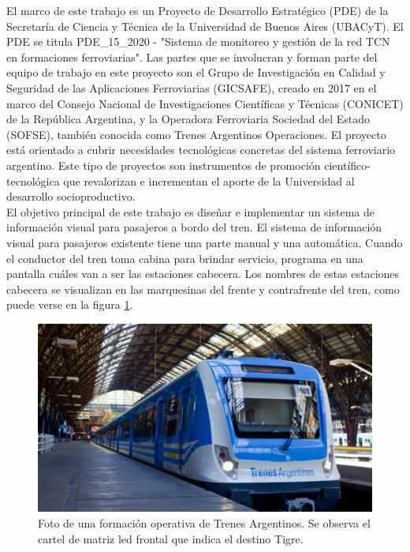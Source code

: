 El  marco de este trabajo es un Proyecto de Desarrollo Estratégico (PDE) de la Secretaría de Ciencia y Técnica de la Universidad de Buenos Aires (UBACyT). El PDE se titula PDE\_15\_2020 - "Sistema de monitoreo y gestión de la red TCN en formaciones ferroviarias". Las partes que se involucran y forman parte del equipo de trabajo en este proyecto son el Grupo de Investigación en Calidad y Seguridad de las Aplicaciones Ferroviarias (GICSAFE), creado en 2017 en el marco del Consejo Nacional de Investigaciones Científicas y Técnicas (CONICET) de la República Argentina, y la  Operadora Ferroviaria Sociedad del Estado (SOFSE), también conocida como Trenes Argentinos Operaciones. El proyecto está orientado a cubrir necesidades tecnológicas concretas del sistema ferroviario argentino. Este tipo de proyectos son instrumentos de promoción científico-tecnológica que revalorizan e incrementan el aporte de la Universidad al desarrollo socioproductivo.\\

El objetivo principal de este trabajo es diseñar e implementar un sistema de información visual para pasajeros a bordo del tren. El sistema de información visual para pasajeros existente tiene una parte manual y una automática. Cuando el conductor del tren toma cabina para brindar servicio, programa en una pantalla cuáles van a ser las estaciones cabecera. Los nombres de estas estaciones cabecera se visualizan en las marquesinas del frente y contrafrente del tren, como puede verse en la figura \ref{fig:tren}.

\begin{figure}[ht]
	\centering
	\includegraphics[width=1\textwidth]{./Figures/tren.jpg}
	\caption{Foto de una formación operativa de Trenes Argentinos. Se observa el cartel de matriz led frontal que indica el destino Tigre.}
	\label{fig:tren}
\end{figure}


